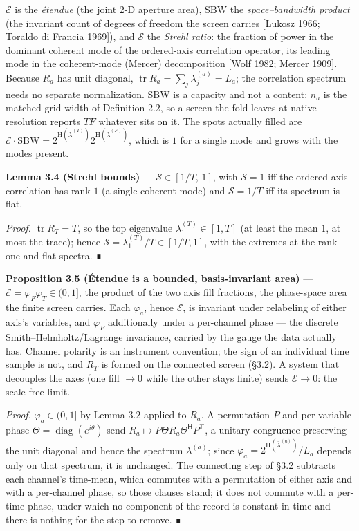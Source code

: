 \documentclass[10pt,letterpaper,twocolumn]{article}
\begin{document}
\(\mathcal E\) is the \emph{étendue} (the joint 2-D aperture area), \(\mathrm{SBW}\) the \emph{space--bandwidth product} (the invariant count of degrees of freedom the screen carries {[}Lukosz 1966; Toraldo di Francia 1969{]}), and \(\mathcal S\) the \emph{Strehl ratio}: the fraction of power in the dominant coherent mode of the ordered-axis correlation operator, its leading mode in the coherent-mode (Mercer) decomposition {[}Wolf 1982; Mercer 1909{]}. Because \(R_a\) has unit diagonal, \(\operatorname{tr}R_a=\sum_j\lambda^{(a)}_j=L_a\); the correlation spectrum needs no separate normalization. \(\mathrm{SBW}\) is a capacity and not a content: \(n_a\) is the matched-grid width of Definition 2.2, so a screen the fold leaves at native resolution reports \(TF\) whatever sits on it. The spots actually filled are \(\mathcal E\cdot\mathrm{SBW}=2^{\mathrm H(\bar\lambda^{(T)})}2^{\mathrm H(\bar\lambda^{(F)})}\), which is \(1\) for a single mode and grows with the modes present.

\textbf{Lemma 3.4 (Strehl bounds)} --- \(\mathcal S\in[1/T,\,1]\), with \(\mathcal S=1\) iff the ordered-axis correlation has rank \(1\) (a single coherent mode) and \(\mathcal S=1/T\) iff its spectrum is flat.

\emph{Proof.} \(\operatorname{tr}R_T=T\), so the top eigenvalue \(\lambda^{(T)}_1\in[1,T]\) (at least the mean \(1\), at most the trace); hence \(\mathcal S=\lambda^{(T)}_1/T\in[1/T,1]\), with the extremes at the rank-one and flat spectra. ∎

\textbf{Proposition 3.5 (Étendue is a bounded, basis-invariant area)} --- \(\mathcal E=\varphi_F\varphi_T\in(0,1]\), the product of the two axis fill fractions, the phase-space area the finite screen carries. Each \(\varphi_a\), hence \(\mathcal E\), is invariant under relabeling of either axis's variables, and \(\varphi_F\) additionally under a per-channel phase --- the discrete Smith--Helmholtz/Lagrange invariance, carried by the gauge the data actually has. Channel polarity is an instrument convention; the sign of an individual time sample is not, and \(R_T\) is formed on the connected screen (§3.2). A system that decouples the axes (one fill \(\to 0\) while the other stays finite) sends \(\mathcal E\to0\): the scale-free limit.

\emph{Proof.} \(\varphi_a\in(0,1]\) by Lemma 3.2 applied to \(R_a\). A permutation \(P\) and per-variable phase \(\Theta=\operatorname{diag}(e^{i\theta})\) send \(R_a\mapsto P\Theta R_a\Theta^{\mathsf H}P^{\mathsf\top}\), a unitary congruence preserving the unit diagonal and hence the spectrum \(\lambda^{(a)}\); since \(\varphi_a=2^{\mathrm H(\bar\lambda^{(a)})}/L_a\) depends only on that spectrum, it is unchanged. The connecting step of §3.2 subtracts each channel's time-mean, which commutes with a permutation of either axis and with a per-channel phase, so those clauses stand; it does not commute with a per-time phase, under which no component of the record is constant in time and there is nothing for the step to remove. ∎
\end{document}
